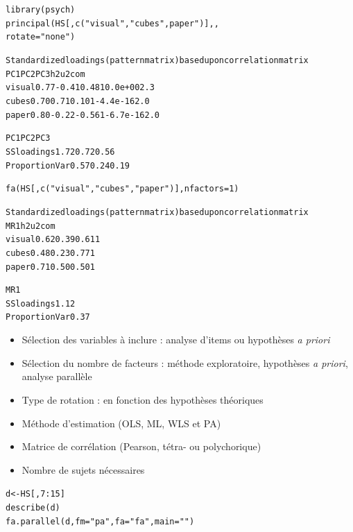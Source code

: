 \begin{alltt}
library(psych)
principal(HS[,c("visual","cubes", paper")], , 
          rotate = "none")
\end{alltt}
\begin{alltt}\small
Standardized loadings (pattern matrix) based upon correlation matrix
        PC1   PC2   PC3 h2       u2 com
visual 0.77 -0.41  0.48  1  0.0e+00 2.3
cubes  0.70  0.71  0.10  1 -4.4e-16 2.0 
paper  0.80 -0.22 -0.56  1 -6.7e-16 2.0

                       PC1  PC2  PC3
SS loadings           1.72 0.72 0.56
Proportion Var        0.57 0.24 0.19
\end{alltt}

\foilhead{}

\begin{alltt}
fa(HS[,c("visual", "cubes", "paper")], nfactors = 1)
\end{alltt}
\begin{alltt}\small
Standardized loadings (pattern matrix) based upon correlation matrix
        MR1   h2   u2 com
visual 0.62 0.39 0.61   1
cubes  0.48 0.23 0.77   1 
paper  0.71 0.50 0.50   1

                MR1
SS loadings    1.12
Proportion Var 0.37
\end{alltt}

\begin{itemize}
\item Sélection des variables à inclure : analyse d'items ou hypothèses \emph{a
    priori}
\item Sélection du nombre de facteurs : méthode exploratoire, hypothèses \emph{a
    priori}, analyse parallèle \autocite{humphreys75}
\item Type de rotation : en fonction des hypothèses théoriques
\item Méthode d'estimation (OLS, ML, WLS et PA)
\item Matrice de corrélation (Pearson, tétra- ou polychorique)  
\item Nombre de sujets nécessaires \autocite{rouquette11}
\end{itemize}



\begin{alltt}
d <- HS[,7:15]
describe(d)
fa.parallel(d, fm = "pa", fa = "fa", main = "")
\end{alltt}

